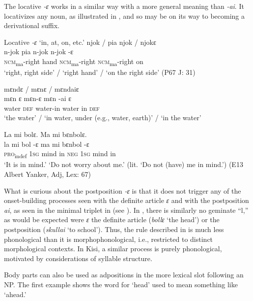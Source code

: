 The locative \textit{{}-ɛ} works in a similar way with a more general meaning than \textit{{}-ai}. It locativizes any noun, as illustrated in , and so may be on its way to becoming a derivational suffix.

\ea%
    \label{ex:88}
  Locative \textit{{}-ɛ} ‘in, at, on, etc.'
  \ea \label{ex:88a} njok / pia njok / njokɛ\\
  \gll n-jok        pia  n-jok          n-jok        {}-ɛ\\
\textsc{ncm}\textsubscript{ma}{}-right  hand  \textsc{ncm}\textsubscript{ma}{}-right    \textsc{ncm}\textsubscript{ma}{}-right  on\\
\glt ‘right, right side' / ‘right hand' / ‘on the right side' (P67 J: 31)

\ex \label{ex:88b} mɛndɛ / mɛnɛ / mɛndaiɛ\\
\gll mɛn  ɛ      mɛn-ɛ                mɛn    {}-ai    ɛ\\
water  \textsc{def}    water-in                water    in    \textsc{def}\\
\glt ‘the water' / ‘in water, under (e.g., water, earth)' / ‘in the water'

\ex \label{ex:88c} La mi bolɛ. Ma mi bɛnbolɛ.\\
\gll la      mi    bol    {}-ɛ      ma  mi    bɛnbol  {}-ɛ\\
\textsc{pro}\textsubscript{indef}  \textsc{1sg}  mind    in      \textsc{neg}  \textsc{1sg}  mind    in\\
\glt ‘It is in mind.' ‘Do not worry about me.' (lit. ‘Do not (have) me in mind.') (E13 Albert Yanker, Adj, Lex: 67)
\z
\z

What is curious about the postposition \textit{{}-ɛ} is that it does not trigger any of the onset-building processes seen with the definite article \textit{ɛ} and with the postposition \textit{ai}, as seen in the minimal triplet in  (see ). In , there is similarly no geminate “l,” as would be expected were \textit{ɛ} the definite article (\textit{bollɛ} ‘the head') or the postposition (\textit{skullai} ‘to school'). Thus, the rule described in  is much less phonological than it is morphophonological, i.e., restricted to distinct morphological contexts. In Kisi, a similar process is purely phonological, motivated by considerations of syllable structure.

Body parts can also be used as adpositions in the more lexical slot following an NP. The first example  shows the word for ‘head' used to mean something like ‘ahead.'

